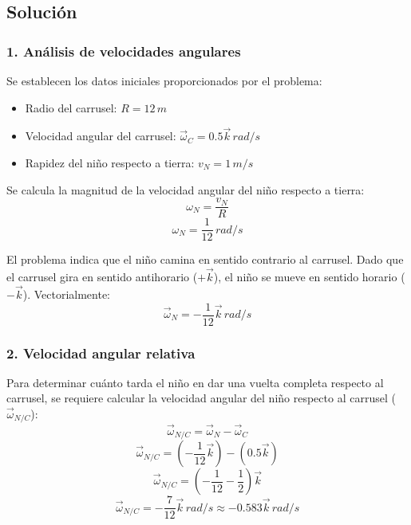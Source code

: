 \documentclass[12pt, a4paper]{article}
\begin{document}
\begin{center}
\end{center}

\subsection*{Solución}

\subsubsection*{1. Análisis de velocidades angulares}
Se establecen los datos iniciales proporcionados por el problema:
\begin{itemize}
    \item Radio del carrusel: $R = 12 \, \si{m}$
    \item Velocidad angular del carrusel: $\vec{\omega}_C = 0.5\vec{k} \, \si{rad/s}$
    \item Rapidez del niño respecto a tierra: $v_N = 1 \, \si{m/s}$
\end{itemize}

Se calcula la magnitud de la velocidad angular del niño respecto a tierra:
$$ \omega_N = \frac{v_N}{R} $$
$$ \omega_N = \frac{1}{12} \, \si{rad/s} $$

El problema indica que el niño camina en sentido contrario al carrusel. Dado que el carrusel gira en sentido antihorario ($+\vec{k}$), el niño se mueve en sentido horario ($-\vec{k}$). Vectorialmente:
$$ \vec{\omega}_N = -\frac{1}{12}\vec{k} \, \si{rad/s} $$

\subsubsection*{2. Velocidad angular relativa}
Para determinar cuánto tarda el niño en dar una vuelta completa respecto al carrusel, se requiere calcular la velocidad angular del niño respecto al carrusel ($\vec{\omega}_{N/C}$):
$$ \vec{\omega}_{N/C} = \vec{\omega}_N - \vec{\omega}_C $$
$$ \vec{\omega}_{N/C} = \left( -\frac{1}{12}\vec{k} \right) - \left( 0.5\vec{k} \right) $$
$$ \vec{\omega}_{N/C} = \left( -\frac{1}{12} - \frac{1}{2} \right)\vec{k} $$
$$ \vec{\omega}_{N/C} = -\frac{7}{12}\vec{k} \, \si{rad/s} \approx -0.583\vec{k} \, \si{rad/s} $$
\end{document}
